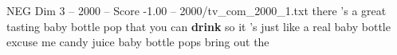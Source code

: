 \begin{textsample}{NEG Dim 3 – 2000 – Score -1.00 – 2000/tv\_com\_2000\_1.txt}  \label{ex:f3_neg_003}
there 's a great tasting baby bottle pop that you can \textbf{drink} so it 's just like a real baby bottle excuse me candy juice baby bottle pops bring out the

\end{textsample}
